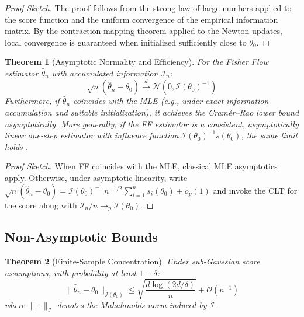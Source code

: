 \documentclass[11pt]{article}
\newtheorem{theorem}{Theorem}
\begin{document}
\begin{proof}[Proof Sketch]
The proof follows from the strong law of large numbers applied to the score function and the uniform convergence of the empirical information matrix. By the contraction mapping theorem applied to the Newton updates, local convergence is guaranteed when initialized sufficiently close to $\theta_0$.
\end{proof}

\begin{theorem}[Asymptotic Normality and Efficiency]
\label{thm:asymptotic_normality}
For the Fisher Flow estimator $\hat{\theta}_n$ with accumulated information $\mathcal{I}_n$:
\begin{equation}
\sqrt{n}(\hat{\theta}_n - \theta_0) \xrightarrow{d} \mathcal{N}(0, \mathcal{I}(\theta_0)^{-1})
\end{equation}
Furthermore, if $\hat{\theta}_n$ coincides with the MLE (e.g., under exact information accumulation and suitable initialization), it achieves the Cramér--Rao lower bound asymptotically. More generally, if the FF estimator is a consistent, asymptotically linear one-step estimator with influence function $\mathcal I(\theta_0)^{-1}s(\theta_0)$, the same limit holds \cite{vanderVaart1998asymptotic}.
\end{theorem}

\begin{proof}[Proof Sketch]
When FF coincides with the MLE, classical MLE asymptotics apply. Otherwise, under asymptotic linearity, write $\sqrt{n}(\hat{\theta}_n-\theta_0) = \mathcal I(\theta_0)^{-1}\,n^{-1/2}\sum_{i=1}^n s_i(\theta_0) + o_p(1)$ and invoke the CLT for the score along with $\mathcal I_n/n \to_p \mathcal I(\theta_0)$.
\end{proof}

\subsection{Non-Asymptotic Bounds}

\begin{theorem}[Finite-Sample Concentration]
\label{thm:concentration}
Under sub-Gaussian score assumptions, with probability at least $1-\delta$:
\begin{equation}
\|\hat{\theta}_n - \theta_0\|_{\mathcal{I}(\theta_0)} \leq \sqrt{\frac{d \log(2d/\delta)}{n}} + \mathcal{O}(n^{-1})
\end{equation}
where $\|\cdot\|_{\mathcal{I}}$ denotes the Mahalanobis norm induced by $\mathcal{I}$.
\end{theorem}
\end{document}
